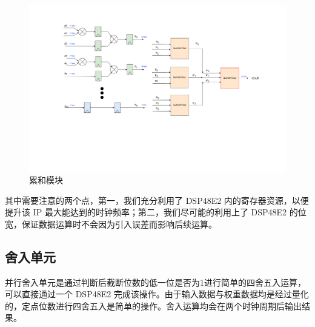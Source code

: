 \documentclass[12pt, a4paper, oneside]{ctexbook}
\begin{document}
		\begin{figure}[h]
		\centering
		\includegraphics[scale=0.52]{pic/sum}
		\caption{累和模块}
		\label{sum}
		\end{figure}
	其中需要注意的两个点，第一，我们充分利用了 DSP48E2 内的寄存器资源，以便提升该 IP 最大能达到的时钟频率；第二，我们尽可能的利用上了 DSP48E2 的位宽，保证数据运算时不会因为引入误差而影响后续运算。
	
	\subsection{舍入单元}\label{round_unit}
	并行舍入单元是通过判断后截断位数的低一位是否为1进行简单的四舍五入运算，可以直接通过一个 DSP48E2 完成该操作。由于输入数据与权重数据均是经过量化的，定点位数进行四舍五入是简单的操作。舍入运算均会在两个时钟周期后输出结果。
		
\end{document}

